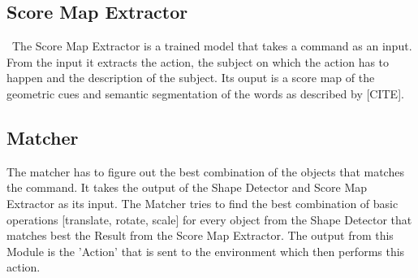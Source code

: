 \documentclass{article}
\begin{document}
     \subsection{Score Map Extractor}\
     The Score Map Extractor is a trained model that takes a command as an input. From the input it extracts the action, the subject on which the action has to happen and the description of the subject. Its ouput is a score map of the geometric cues and semantic segmentation of the words as described by [CITE].
     \subsection{Matcher}
     The matcher has to figure out the best combination of the objects that matches the command. It takes the output of the Shape Detector and Score Map Extractor as its input. The Matcher tries to find the best combination of basic operations [translate, rotate, scale] for every object from the Shape Detector that matches best the Result from the Score Map Extractor. The output from this Module is the 'Action' that is sent to the environment which then performs this action.
	
\end{document}
